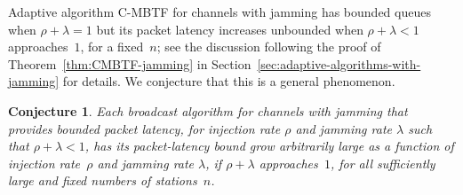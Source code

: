 \documentclass[11pt]{article}
\newtheorem{conjecture}{Conjecture}
\begin{document}
Adaptive algorithm \textsc{C-MBTF} for channels with jamming has bounded queues when $\rho+\lambda=1$ but its packet latency increases unbounded when $\rho+\lambda<1$ approaches~$1$, for a fixed~$n$; see the discussion following the proof of Theorem~\ref{thm:CMBTF-jamming} in Section~\ref{sec:adaptive-algorithms-with-jamming} for details.
We conjecture that this is a general phenomenon.


\begin{conjecture}
Each broadcast algorithm for channels with jamming that provides bounded packet latency, for injection rate $\rho$ and jamming rate $\lambda$ such that $\rho+\lambda<1$, has its packet-latency bound grow arbitrarily large as a function of injection rate~$\rho$ and jamming rate $\lambda$, if $\rho+\lambda$  approaches~$1$, for all sufficiently large and fixed numbers of stations~$n$.
\end{conjecture}


\end{document}
